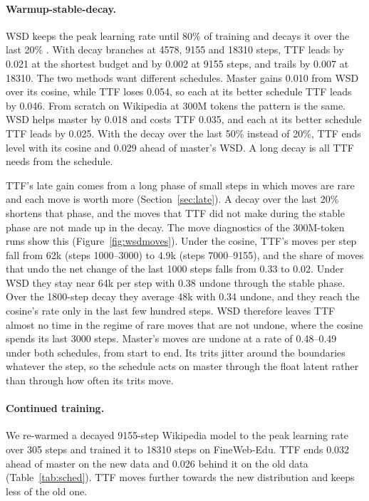 \documentclass[10pt,twocolumn]{article}
\begin{document}
\paragraph{Warmup-stable-decay.} WSD keeps the peak learning rate until 80\% of training and decays it over the last
20\% \citep{hu2024minicpm,hagele2024scaling}. With decay branches at 4578, 9155 and 18310 steps, TTF leads by 0.021 at
the shortest budget and by 0.002 at 9155 steps, and trails by 0.007 at 18310. The two methods want different schedules.
Master gains 0.010 from WSD over its cosine, while TTF loses 0.054, so each at its better schedule TTF leads by 0.046.
From scratch on Wikipedia at 300M tokens the pattern is the same. WSD helps master by 0.018 and costs TTF 0.035, and each
at its better schedule TTF leads by 0.025. With the decay over the last 50\% instead of 20\%, TTF ends level with its
cosine and 0.029 ahead of master's WSD. A long decay is all TTF needs from the schedule.

TTF's late gain comes from a long phase of small steps in which moves are rare and each move is worth more
(Section~\ref{sec:late}). A decay over the last 20\% shortens that phase, and the moves that TTF did not make during the
stable phase are not made up in the decay. The move diagnostics of the 300M-token runs show this
(Figure~\ref{fig:wsdmoves}). Under the cosine, TTF's moves per step fall from 62k (steps 1000--3000) to 4.9k (steps
7000--9155), and the share of moves that undo the net change of the last 1000 steps falls from 0.33 to 0.02. Under WSD
they stay near 64k per step with 0.38 undone through the stable phase. Over the 1800-step decay they average 48k with
0.34 undone, and they reach the cosine's rate only in the last few hundred steps. WSD therefore leaves TTF almost no time
in the regime of rare moves that are not undone, where the cosine spends its last 3000 steps. Master's moves are undone
at a rate of 0.48--0.49 under both schedules, from start to end. Its trits jitter around the boundaries whatever the
step, so the schedule acts on master through the float latent rather than through how often its trits move.

\paragraph{Continued training.} We re-warmed a decayed 9155-step Wikipedia model to the peak learning rate over 305 steps
and trained it to 18310 steps on FineWeb-Edu. TTF ends 0.032 ahead of master on the new data and 0.026 behind it on the
old data (Table~\ref{tab:sched}). TTF moves further towards the new distribution and keeps less of the old one.
\end{document}
